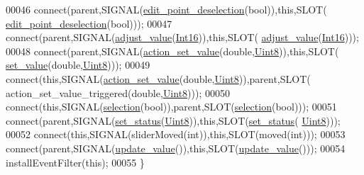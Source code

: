 \begin{DoxyCode}
00046     connect(parent,SIGNAL(\hyperlink{a00024_a105dff1f3ae7cfdcfabacd013428a501}{edit\_point\_deselection}(\textcolor{keywordtype}{bool})),\textcolor{keyword}{this},SLOT(
      \hyperlink{a00024_a105dff1f3ae7cfdcfabacd013428a501}{edit\_point\_deselection}(\textcolor{keywordtype}{bool})));
00047     connect(parent,SIGNAL(\hyperlink{a00024_a521ac5143857dd652a0bafa77389fa81}{adjust\_value}(\hyperlink{a00001_a3985266aecb120f269789241c170850c}{Int16})),\textcolor{keyword}{this},SLOT(
      \hyperlink{a00024_a521ac5143857dd652a0bafa77389fa81}{adjust\_value}(\hyperlink{a00001_a3985266aecb120f269789241c170850c}{Int16})));
00048     connect(parent,SIGNAL(\hyperlink{a00024_a886f07f2c612121bec703581f9398a10}{action\_set\_value}(\textcolor{keywordtype}{double},\hyperlink{a00001_a979e3e23b9a449e69ab6a8a83b6042f8}{Uint8})),\textcolor{keyword}{this},SLOT(
      \hyperlink{a00024_ae3010d3de02715db2f443560d7d2a27b}{set\_value}(\textcolor{keywordtype}{double},\hyperlink{a00001_a979e3e23b9a449e69ab6a8a83b6042f8}{Uint8})));
00049     connect(\textcolor{keyword}{this},SIGNAL(\hyperlink{a00024_a886f07f2c612121bec703581f9398a10}{action\_set\_value}(\textcolor{keywordtype}{double},\hyperlink{a00001_a979e3e23b9a449e69ab6a8a83b6042f8}{Uint8})),parent,SLOT(
      action\_set\_value\_triggered(\textcolor{keywordtype}{double},\hyperlink{a00001_a979e3e23b9a449e69ab6a8a83b6042f8}{Uint8})));
00050     connect(\textcolor{keyword}{this},SIGNAL(\hyperlink{a00024_a66bf875d43a16cf37527ab75c439fd8e}{selection}(\textcolor{keywordtype}{bool})),parent,SLOT(\hyperlink{a00024_a66bf875d43a16cf37527ab75c439fd8e}{selection}(\textcolor{keywordtype}{bool})));
00051     connect(parent,SIGNAL(\hyperlink{a00024_a567902754e43310fe921b74c9d1862dd}{set\_status}(\hyperlink{a00001_a979e3e23b9a449e69ab6a8a83b6042f8}{Uint8})),\textcolor{keyword}{this},SLOT(\hyperlink{a00024_a567902754e43310fe921b74c9d1862dd}{set\_status}(
      \hyperlink{a00001_a979e3e23b9a449e69ab6a8a83b6042f8}{Uint8})));
00052     connect(\textcolor{keyword}{this},SIGNAL(sliderMoved(\textcolor{keywordtype}{int})),\textcolor{keyword}{this},SLOT(moved(\textcolor{keywordtype}{int})));
00053     connect(parent,SIGNAL(\hyperlink{a00024_a4f62a01554ee8d975abe0cb136937695}{update\_value}()),\textcolor{keyword}{this},SLOT(\hyperlink{a00024_a4f62a01554ee8d975abe0cb136937695}{update\_value}()));
00054     installEventFilter(\textcolor{keyword}{this});
00055 \}
\end{DoxyCode}


